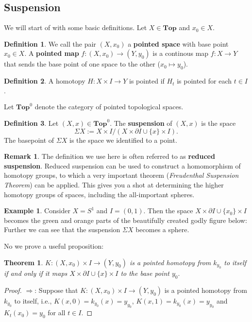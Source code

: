\documentclass{article}
\newtheorem{theorem}{Theorem}[section]
\theoremstyle{definition}
\newtheorem{ex}{Example}[section]
\newtheorem{remark}{Remark}
\newtheorem{defn}{Definition}[section]
\newcommand{\cat}{\mathbf}
\begin{document}
\subsection{Suspension} We will start of with some basic definitions. Let $X\in \cat{Top}$ and $x_0\in X$. \begin{defn}
We call the pair $(X,x_0)$ a \textbf{pointed space} with base point $x_0\in X$. A \textbf{pointed map} $f:(X,x_0)\rightarrow (Y,y_0)$ is a continous map $f:X \rightarrow Y$ that sends the base point of one space to the other ($x_0 \mapsto y_0$).
\end{defn} 
\begin{defn}
A homotopy $H:X\times I \rightarrow Y$ is pointed if $H_t$ is pointed for each $t\in I$.
\end{defn}
Let $\cat{Top}^{0}$ denote the category of pointed topological spaces. 
\begin{defn} Let $(X,x)\in\cat{Top}^{0}$. The \textbf{suspension} of $(X,x)$ is the space \[\Sigma X:=X\times I/(X\times\partial I\cup\{x\}\times I).\] The basepoint of $\Sigma X$ is the space we identified to a point. 
\end{defn}
\begin{remark}
The definition we use here is often referred to as \textbf{reduced suspension}. Reduced suspension can be used to construct a homomorphism of homotopy groups, to which a very important theorem (\textit{Freudenthal Suspension Theorem}) can be applied. This gives you a shot at determining the higher homotopy groups of spaces, including the all-important spheres.
\end{remark}
\begin{ex}
Consider $X=S^1$ and $I=(0,1)$. Then the space $X\times\partial I\cup\{x_0\}\times I$ becomes the green and orange parts of the beautifully created godly figure below:
Further we can see that the suspension $\Sigma X$ becomes a sphere.
\end{ex}
No we prove a useful proposition:
\begin{theorem}
$K:(X,x_{0})\times I\rightarrow (Y,y_{0})$ is a pointed homotopy from $k_{y_{0}}$ to itself if and only if it maps $X\times\partial I\cup\{x\}\times I$ to the base point $y_{0}.$
\end{theorem}
\begin{proof}
$\Rightarrow$: Suppose that $K:(X,x_{0})\times I\rightarrow (Y,y_{0})$ is a pointed homotopy from $k_{y_{0}}$ to itself, i.e., $K(x,0)=k_{y_0}(x)=y_{y_0}$, $K(x,1)=k_{y_0}(x)=y_{y_0}$ and $K_t(x_0)=y_0$ for all $t\in I$.  
\end{proof}
\end{document}
